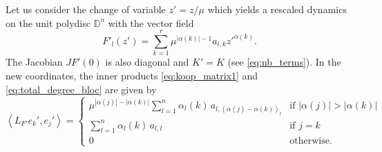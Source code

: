 \documentclass{article}
\begin{document}
Let us consider the change of variable $z'=z/\mu$ which yields a rescaled dynamics on the unit polydisc $\mathbb{D}^n $ with the vector field
\begin{equation}\label{eq_rescal_newdynamic}
F'_l(z')=\sum_{k=1}^{r} \mu^{|\alpha(k) |-1}a_{l,k} z'^{\alpha(k)}.
\end{equation}
The Jacobian  $JF'(0)$ is also  diagonal and $K'=K$  (see \eqref{eq:nb_terms}).
In the new coordinates, the inner products  \eqref{eq:koop_matrix1} and \eqref{eq:total_degree_bloc} are given by
{\small
\begin{equation}\label{eq:koop_matrix1_new}
\left\langle L_{F'}e_{k}',e_{j}' \right\rangle = \begin{cases} \mu^{|\alpha(j) |- |\alpha(k) |} \sum_{l=1}^n \alpha_l(k)  \, a_{l,(\alpha(j)-\alpha(k))_l} & \text{if } |\alpha(j) |> |\alpha(k)| \\ 
\sum_{l=1}^n \alpha_l(k)  \, a_{l,l} & \text{if } j= k \\
0 & \text{otherwise}.
\end{cases}
\end{equation}}
\end{document}

